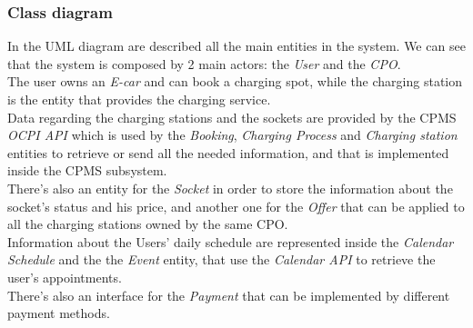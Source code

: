\documentclass[table, 12pt]{article} %
\begin{document}
        \subsubsection{Class diagram}
        \label{class_diagram}
            In the UML diagram are described all the main entities in the system.
            We can see that the system is composed by 2 main actors: the \textit{User} and the \textit{CPO}.\\
            The user owns an \textit{E-car} and can book a charging spot, while the charging station is the entity that provides the charging service.\\
            Data regarding the charging stations and the sockets are provided by the CPMS \textit{OCPI API} which is used by the \textit{Booking}, \textit{Charging Process} and \textit{Charging station} entities to retrieve or send all the needed information, and that is implemented inside the CPMS subsystem.\\
            There's also an entity for the \textit{Socket} in order to store the information about the socket's status and his price, and another one for the \textit{Offer} that can be applied to all the charging stations owned by the same CPO.\\
            Information about the Users' daily schedule are represented inside the \textit{Calendar Schedule} and the the \textit{Event} entity, that use the \textit{Calendar API} to retrieve the user's appointments.\\
            There's also an interface for the \textit{Payment} that can be implemented by different payment methods.
            
\end{document}
